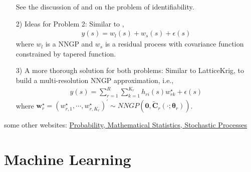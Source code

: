 \documentclass[
12pt, %
a4paper, %
oneside, %
headinclude,footinclude, %
BCOR5mm, %
]{scrartcl}
\begin{document}
\begin{itemize}
See the discussion of 
\href{https://chenyw68.github.io/Literature/[2013]identifiability)hierarchical factor models for large spatially misaligned data_ a low-rank predictive process approach.pdf}{\cite{ren2013hierarchical}} and \href{https://chenyw68.github.io/Literature/[2013]identifiability)hierarchical factor models for large spatially misaligned data_ a low-rank predictive process approach.pdf}{\cite{wang2003generalized}} on the problem of identifiability.


 \item [2)] Ideas for Problem 2: Similar to \href{https://chenyw68.github.io/Literature/[2012]A full scale approximation of covariance functions for large spatial data sets.pdf}{\cite{sang2012full}},
\begin{equation}
    \begin{aligned}
       y(s) = w_l(s) + w_s(s) + \epsilon(s)
    \end{aligned} \label{DP1}
\end{equation}
where $w_l$ is a NNGP and $w_s$ is a residual process with covariance function constrained by tapered function.
 \item [3)] A more thorough solution for both problems: Similar to LatticeKrig, to build a multi-resolution NNGP approximation, i.e.,
 \begin{equation}
\begin{aligned}
y(s) = \sum_{r = 1}^{R}\sum_{k = 1}^{K_r}h_{ri}(s)w_{rk}^{\star}  + \epsilon(s)
\end{aligned} \label{DP1}
\end{equation}
where $\boldsymbol{w}_r^{\star} = \left(w_{r, 1}^{\star}, \cdots, w_{r, K_r}^{\star}\right)^\prime \sim NNGP\left(\boldsymbol{0}, \boldsymbol{\tilde{C}}_r(\cdot; \boldsymbol{\theta}_r)\right)$.
\end{itemize}


some other websites: \href{http://www.randomservices.org/random/index.html}{Probability, Mathematical Statistics, Stochastic Processes}


\section{Machine Learning}
\href{https://chenyw68.github.io/Literature[2020]spNNGP R package for Nearest Neighbor Gaussian Process models.pdf}{\citep{murphy2012machine}}
\end{document}
